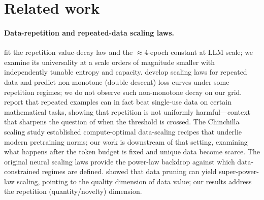 \documentclass[11pt]{article}
\begin{document}
\section{Related work}\label{sec:related}

\paragraph{Data-repetition and repeated-data scaling laws.}
\citet{muennighoff2023scaling} fit the repetition value-decay law and the $\approx
4$-epoch constant at LLM scale; we examine its universality at a scale orders of
magnitude smaller with independently tunable entropy and capacity. \citet{hernandez2022repeateddata} develop
scaling laws for repeated data and predict non-monotone (double-descent) loss curves under
some repetition regimes; we do not observe such non-monotone decay on our grid.
\citet{charton2024repeated} report that repeated examples can in fact beat single-use data
on certain mathematical tasks, showing that repetition is not uniformly harmful---context
that sharpens the question of when the threshold is crossed. The Chinchilla scaling
study \citep{hoffmann2022chinchilla} established compute-optimal data-scaling recipes that
underlie modern pretraining norms; our work is downstream of that setting, examining what
happens after the token budget is fixed and unique data become scarce. The original
neural scaling laws \citep{kaplan2020scalinglaws} provide the power-law backdrop against
which data-constrained regimes are defined. \citet{sorscher2022beyond} showed that data
pruning can yield super-power-law scaling, pointing to the quality dimension of data value;
our results address the repetition (quantity/novelty) dimension.
\end{document}

